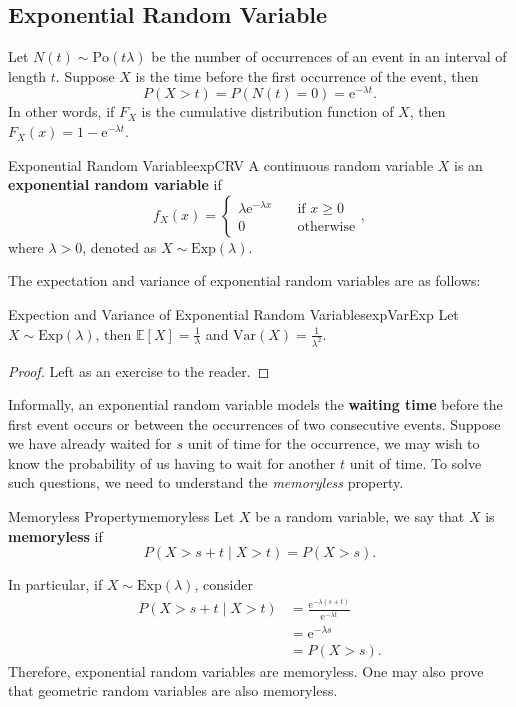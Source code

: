 \documentclass[math]{amznotes}
\theoremstyle{remark}
\newcommand{\0}{\mathbf{0}}
\newcommand{\1}{\mathbf{1}}
\begin{document}
\subsection{Exponential Random Variable}
Let $N(t) \sim \mathrm{Po}(t\lambda)$ be the number of occurrences of an event in an interval of length $t$. Suppose $X$ is the time before the first occurrence of the event, then
\begin{equation*}
    P(X > t) = P(N(t) = 0) = \mathrm{e}^{-\lambda t}.
\end{equation*}
In other words, if $F_X$ is the cumulative distribution function of $X$, then $F_X(x) = 1 - \mathrm{e}^{-\lambda t}$.
\begin{dfnbox}{Exponential Random Variable}{expCRV}
    A continuous random variable $X$ is an {\color{red} \textbf{exponential random variable}} if 
    \begin{equation*}
        f_X(x) = \begin{cases}
            \lambda\mathrm{e}^{-\lambda x} & \quad\textrm{if } x \geq 0 \\
            0 & \quad\textrm{otherwise}
        \end{cases},
    \end{equation*}
    where $\lambda > 0$, denoted as $X \sim \mathrm{Exp}\left(\lambda\right)$.
\end{dfnbox}
The expectation and variance of exponential random variables are as follows:
\begin{probox}{Expection and Variance of Exponential Random Variables}{expVarExp}
    Let $X \sim \mathrm{Exp}(\lambda)$, then $\mathbb{E}[X] = \frac{1}{\lambda}$ and $\mathrm{Var}(X) = \frac{1}{\lambda^2}$.
    \tcblower
    \begin{proof}
        Left as an exercise to the reader.
    \end{proof}
\end{probox}
Informally, an exponential random variable models the \textbf{waiting time} before the first event occurs or between the occurrences of two consecutive events. Suppose we have already waited for $s$ unit of time for the occurrence, we may wish to know the probability of us having to wait for another $t$ unit of time. To solve such questions, we need to understand the \textit{memoryless} property.
\begin{dfnbox}{Memoryless Property}{memoryless}
    Let $X$ be a random variable, we say that $X$ is {\color{red} \textbf{memoryless}} if
    \begin{equation*}
        P(X > s + t \mid X > t) = P(X > s). 
    \end{equation*}
\end{dfnbox}
In particular, if $X \sim \mathrm{Exp}(\lambda)$, consider
\begin{align*}
    P(X > s + t \mid X > t) & = \frac{\mathrm{e}^{-\lambda(s + t)}}{\mathrm{e}^{-\lambda t}} \\
    & = \mathrm{e}^{-\lambda s} \\
    & = P(X > s).
\end{align*}
Therefore, exponential random variables are memoryless. One may also prove that geometric random variables are also memoryless.
\end{document}
